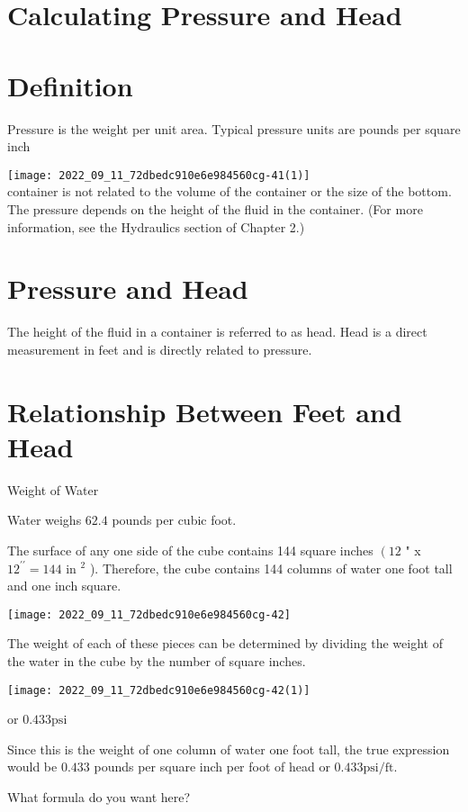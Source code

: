\section{Calculating Pressure and Head}
\section{Definition}
Pressure is the weight per unit area. Typical pressure units are pounds per square inch

\texttt{[image: 2022\_09\_11\_72dbedc910e6e984560cg-41(1)]}\\
container is not related to the volume of the container or the size of the bottom. The pressure depends on the height of the fluid in the container. (For more information, see the Hydraulics section of Chapter 2.)

\section{Pressure and Head}
The height of the fluid in a container is referred to as head. Head is a direct measurement in feet and is directly related to pressure.

\section{Relationship Between Feet and Head}
Weight of Water

Water weighs $62.4$ pounds per cubic foot.

The surface of any one side of the cube contains 144 square inches $\left(12\right.$ " x $12^{\prime \prime}=144$ in $^{2}$ ). Therefore, the cube contains 144 columns of water one foot tall and one inch square.

\texttt{[image: 2022\_09\_11\_72dbedc910e6e984560cg-42]}

The weight of each of these pieces can be determined by dividing the weight of the water in the cube by the number of square inches.

\texttt{[image: 2022\_09\_11\_72dbedc910e6e984560cg-42(1)]}

or $0.433 \mathrm{psi}$

Since this is the weight of one column of water one foot tall, the true expression would be $0.433$ pounds per square inch per foot of head or $0.433 \mathrm{psi} / \mathrm{ft}$.

What formula do you want here?

